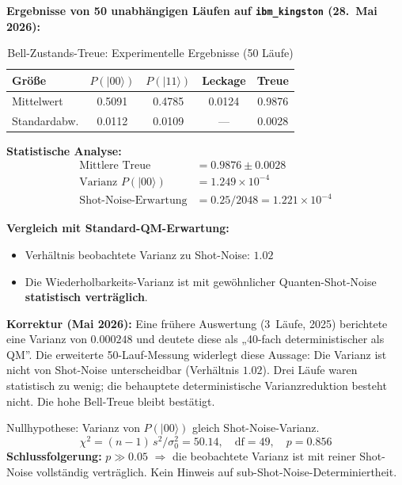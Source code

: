 \textbf{Ergebnisse von 50 unabhängigen Läufen auf \texttt{ibm\_kingston} (28.~Mai 2026):}

\begin{table}[h]
	\centering
	\caption{Bell-Zustands-Treue: Experimentelle Ergebnisse (50 Läufe)}
	\label{tab:bell_fidelity}
	\begin{tabular}{@{}lcccc@{}}
		\toprule
		Größe & $P(|00\rangle)$ & $P(|11\rangle)$ & Leckage & Treue \\
		\midrule
		Mittelwert & 0.5091 & 0.4785 & 0.0124 & 0.9876 \\
		Standardabw. & 0.0112 & 0.0109 & --- & 0.0028 \\
		\bottomrule
	\end{tabular}
\end{table}

\textbf{Statistische Analyse:}
\begin{align}
	\text{Mittlere Treue} &= 0.9876 \pm 0.0028 \\
	\text{Varianz } P(|00\rangle) &= 1.249 \times 10^{-4} \\
	\text{Shot-Noise-Erwartung} &= 0.25/2048 = 1.221 \times 10^{-4}
\end{align}

\textbf{Vergleich mit Standard-QM-Erwartung:}
\begin{itemize}
	\item Verhältnis beobachtete Varianz zu Shot-Noise: $1.02$
	\item Die Wiederholbarkeits-Varianz ist mit gewöhnlicher Quanten-Shot-Noise \textbf{statistisch verträglich}.
\end{itemize}

\begin{important}
	\textbf{Korrektur (Mai 2026):} Eine frühere Auswertung (3~Läufe, 2025) berichtete eine Varianz von $0.000248$ und deutete diese als „40-fach deterministischer als QM''. Die erweiterte 50-Lauf-Messung widerlegt diese Aussage: Die Varianz ist nicht von Shot-Noise unterscheidbar (Verhältnis $1.02$). Drei Läufe waren statistisch zu wenig; die behauptete deterministische Varianzreduktion besteht nicht. Die hohe Bell-Treue bleibt bestätigt.
\end{important}

\begin{keyresult}
	Nullhypothese: Varianz von $P(|00\rangle)$ gleich Shot-Noise-Varianz.
	\begin{equation}
		\chi^2 = (n-1)\,s^2/\sigma_0^2 = 50.14, \quad \mathrm{df}=49, \quad p = 0.856
	\end{equation}
	\textbf{Schlussfolgerung:} $p \gg 0.05$ $\Rightarrow$ die beobachtete Varianz ist mit reiner Shot-Noise vollständig verträglich. Kein Hinweis auf sub-Shot-Noise-Determiniertheit.
\end{keyresult}

